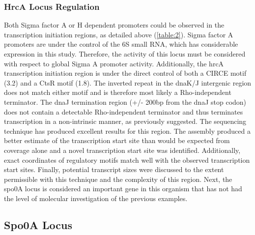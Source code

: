 \subsubsection{HrcA Locus Regulation}
Both Sigma factor A or H dependent promoters could be observed in the transcription initiation regions, as detailed above (\ref{table:2}). Sigma factor A promoters are under the control of the 6S small RNA, which has considerable expression in this study. Therefore, the activity of this locus must be considered with respect to global Sigma A promoter activity. Additionally, the hrcA transcription initiation region is under the direct control of both a CIRCE motif (3.2) and a CtsR motif (1.8)\cite{42}. The inverted repeat in the dnaK/J intergenic region does not match either motif and is therefore most likely a Rho-independent terminator. The dnaJ termination region (+/- 200bp from the dnaJ stop codon) does not contain a detectable Rho-independent terminator and thus terminates transcription in a non-intrinsic manner, as previously suggested\cite{83}. The sequencing technique has produced excellent results for this region. The assembly produced a better estimate of the transcription start site than would be expected from coverage alone and a novel transcription start site was identified. Additionally, exact coordinates of regulatory motifs match well with the observed transcription start sites. Finally, potential transcript sizes were discussed to the extent permissible with this technique and the complexity of this region. Next, the spo0A locus is considered an important gene in this organism that has not had the level of molecular investigation of the previous examples.




\subsection{Spo0A Locus}

